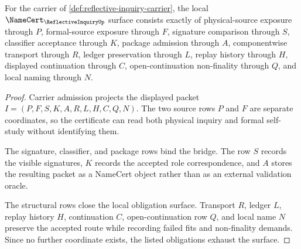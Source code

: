 \begin{theorem}
\label{thm:reflective-inquiry-namecert-obligation-surface}
For the carrier of \autoref{def:reflective-inquiry-carrier}, the local $\NameCert_{\ReflectiveInquiryUp}$ surface consists exactly of physical-source exposure through $P$, formal-source exposure through $F$, signature comparison through $S$, classifier acceptance through $K$, package admission through $A$, componentwise transport through $R$, ledger preservation through $L$, replay history through $H$, displayed continuation through $C$, open-continuation non-finality through $Q$, and local naming through $N$.
\end{theorem}
\begin{proof}
Carrier admission projects the displayed packet $I=(P,F,S,K,A,R,L,H,C,Q,N)$. The two source rows $P$ and $F$ are separate coordinates, so the certificate can read both physical inquiry and formal self-study without identifying them.

The signature, classifier, and package rows bind the bridge. The row $S$ records the visible signatures, $K$ records the accepted role correspondence, and $A$ stores the resulting packet as a NameCert object rather than as an external validation oracle.

The structural rows close the local obligation surface. Transport $R$, ledger $L$, replay history $H$, continuation $C$, open-continuation row $Q$, and local name $N$ preserve the accepted route while recording failed fits and non-finality demands. Since no further coordinate exists, the listed obligations exhaust the surface.
\end{proof}

